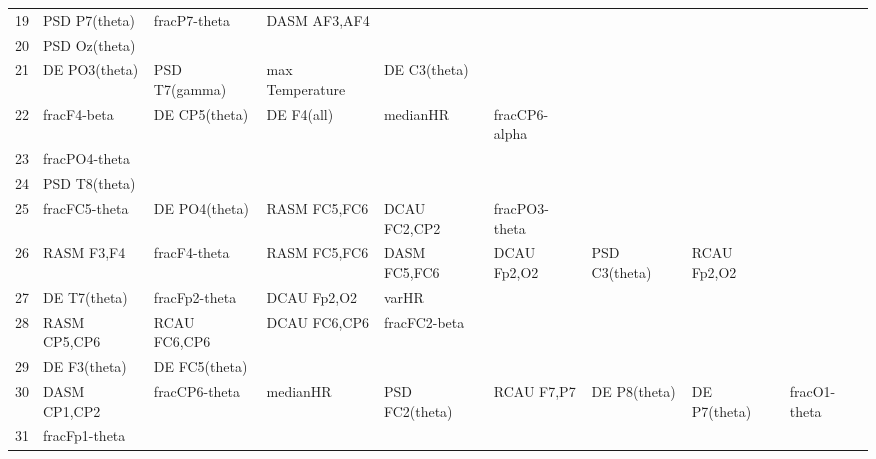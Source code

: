 \begin{landscape}
\begin{table}[]
\begin{tabular}{l|llllllll}
19                 & PSD P7(theta)        & fracP7-theta            & DASM AF3,AF4         &                    &                       &                      &                 &                 \\
20                 & PSD Oz(theta)        &                         &                      &                    &                       &                      &                 &                 \\
21                 & DE PO3(theta)        & PSD T7(gamma)           & max Temperature      & DE C3(theta)       &                       &                      &                 &                 \\
22                 & fracF4-beta          & DE CP5(theta)           & DE F4(all)           & medianHR           & fracCP6-alpha         &                      &                 &                 \\
23                 & fracPO4-theta        &                         &                      &                    &                       &                      &                 &                 \\
24                 & PSD T8(theta)        &                         &                      &                    &                       &                      &                 &                 \\
25                 & fracFC5-theta        & DE PO4(theta)           & RASM FC5,FC6         & DCAU FC2,CP2       & fracPO3-theta         &                      &                 &                 \\
26                 & RASM F3,F4           & fracF4-theta            & RASM FC5,FC6         & DASM FC5,FC6       & DCAU Fp2,O2           & PSD C3(theta)        & RCAU Fp2,O2     &                 \\
27                 & DE T7(theta)         & fracFp2-theta           & DCAU Fp2,O2          & varHR              &                       &                      &                 &                 \\
28                 & RASM CP5,CP6         & RCAU FC6,CP6            & DCAU FC6,CP6         & fracFC2-beta       &                       &                      &                 &                 \\
29                 & DE F3(theta)         & DE FC5(theta)           &                      &                    &                       &                      &                 &                 \\
30                 & DASM CP1,CP2         & fracCP6-theta           & medianHR             & PSD FC2(theta)     & RCAU F7,P7            & DE P8(theta)         & DE P7(theta)    & fracO1-theta    \\
31                 & fracFp1-theta        &                         &                      &                    &                       &                      &                 &                 \\
\end{tabular}
\end{table}
\end{landscape}
